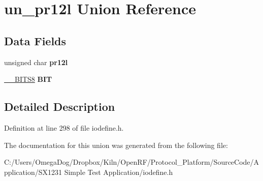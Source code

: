 \hypertarget{unionun__pr12l}{\section{un\-\_\-pr12l Union Reference}
\label{unionun__pr12l}
}
\subsection*{Data Fields}
\begin{DoxyCompactItemize}
\item 
\hypertarget{unionun__pr12l_a5ff809b86ee6de74cdb4f1d6de7646a2}{unsigned char {\bfseries pr12l}}\label{unionun__pr12l_a5ff809b86ee6de74cdb4f1d6de7646a2}

\item 
\hypertarget{unionun__pr12l_a983fe5e6ed5cab0b7d8a5130c79304c2}{\hyperlink{struct_____b_i_t_s8}{\-\_\-\-\_\-\-B\-I\-T\-S8} {\bfseries B\-I\-T}}\label{unionun__pr12l_a983fe5e6ed5cab0b7d8a5130c79304c2}

\end{DoxyCompactItemize}


\subsection{Detailed Description}


Definition at line 298 of file iodefine.\-h.



The documentation for this union was generated from the following file\-:\begin{DoxyCompactItemize}
\item 
C\-:/\-Users/\-Omega\-Dog/\-Dropbox/\-Kiln/\-Open\-R\-F/\-Protocol\-\_\-\-Platform/\-Source\-Code/\-Application/\-S\-X1231 Simple Test Application/iodefine.\-h\end{DoxyCompactItemize}
